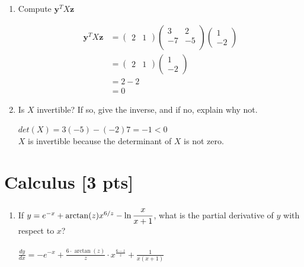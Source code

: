 \documentclass[a4paper]{article}
\theoremstyle{definition}
\newenvironment{soln}{
	\leavevmode\color{blue}\ignorespaces
}{}
\begin{document}
	\begin{enumerate}
		\item 	Compute $\mathbf{y}^{T} X \mathbf{z}$\\
			    \begin{soln} 
						\begin{align*}
			    		\mathbf{y}^{T} X \mathbf{z} &= \begin{pmatrix}
			    			2 & 1
			    		\end{pmatrix} \begin{pmatrix}
			    			3 & 2 \\ -7 & -5 \\
			    		\end{pmatrix} \begin{pmatrix}
			    			1 \\ -2
			    		\end{pmatrix} \\
			    		&= \begin{pmatrix}
			    			2 & 1
			    		\end{pmatrix} \begin{pmatrix}
			    			1 \\ -2
			    		\end{pmatrix} \\
			    		&= 2 - 2 \\
			    		&= 0
			    	\end{align*}
				\end{soln}
		\item 	Is $X$ invertible? If so, give the inverse, and if no, explain why not.\\
		        \begin{soln}  
				$det(X) = 3 (-5) - (-2)7 = -1 <0$ \\
				$X$ is invertible because the determinant of $X$ is not zero.
				\end{soln}
	\end{enumerate}
	
	
	\section{Calculus [3 pts]}
	\begin{enumerate}
		\item If $y = e^{-x} + \arctan(z)x^{6/z} - \ln\cfrac{x}{x+1}$, what is the partial derivative of $y$ with respect to $x$?\\
		\begin{soln}\\  
		$\frac{dy}{dx} = -e^{-x} + \frac{6\cdot \arctan(z)}{z} \cdot x^{\frac{6-z}{z}}+\frac{1}{x(x+1)}$ 
		\end{soln}
	\end{enumerate}
	
\end{document}
